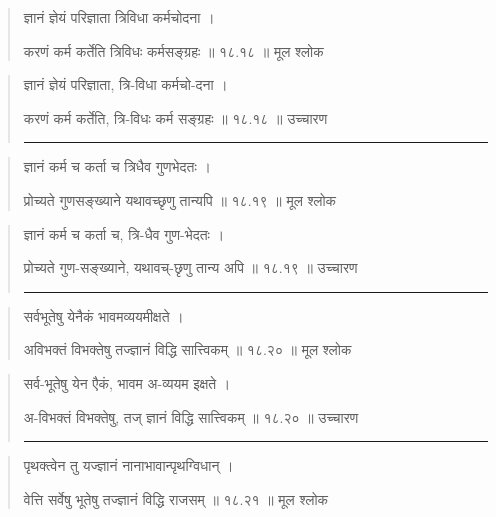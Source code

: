 \begin{quotation}

ज्ञानं ज्ञेयं परिज्ञाता त्रिविधा कर्मचोदना  ।  

करणं कर्म कर्तेति त्रिविधः कर्मसङ्ग्रहः  ॥ १८.१८ ॥  मूल श्लोक
\end{quotation}

\begin{quotation}

ज्ञानं ज्ञेयं परिज्ञाता, त्रि-विधा कर्मचो-दना  ।  

करणं कर्म कर्तेति, त्रि-विधः कर्म सङ्ग्रहः  ॥ १८.१८ ॥  उच्चारण

\noindent\rule{16cm}{0.4pt} 
\end{quotation}


\begin{quotation}

ज्ञानं कर्म च कर्ता च त्रिधैव गुणभेदतः  ।  

प्रोच्यते गुणसङ्ख्याने यथावच्छृणु तान्यपि  ॥ १८.१९ ॥  मूल श्लोक
\end{quotation}

\begin{quotation}

ज्ञानं कर्म च कर्ता च, त्रि-धैव गुण-भेदतः  ।  

प्रोच्यते गुण-सङ्ख्याने, यथावच्-छृणु तान्य अपि  ॥ १८.१९ ॥  उच्चारण

\noindent\rule{16cm}{0.4pt} 
\end{quotation}


\begin{quotation}

सर्वभूतेषु येनैकं भावमव्ययमीक्षते  ।  

अविभक्तं विभक्तेषु तज्ज्ञानं विद्धि सात्त्विकम्  ॥ १८.२० ॥  मूल श्लोक
\end{quotation}

\begin{quotation}

सर्व-भूतेषु येन एैकं, भावम अ-व्ययम इक्षते  ।  

अ-विभक्तं विभक्तेषु, तज् ज्ञानं विद्धि सात्त्विकम्  ॥ १८.२० ॥  उच्चारण

\noindent\rule{16cm}{0.4pt} 
\end{quotation}


\begin{quotation}

पृथक्त्वेन तु यज्ज्ञानं नानाभावान्पृथग्विधान्‌  ।  

वेत्ति सर्वेषु भूतेषु तज्ज्ञानं विद्धि राजसम्‌  ॥ १८.२१ ॥  मूल श्लोक
\end{quotation}

